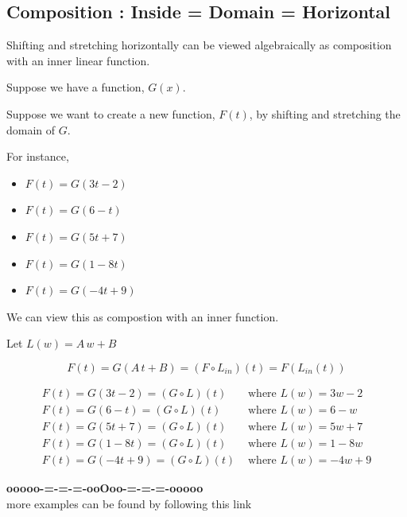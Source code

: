 \documentclass{ximera}
\begin{document}
\subsection*{Composition : Inside = Domain = Horizontal}






Shifting and stretching horizontally can be viewed algebraically as composition with an inner linear function.



Suppose we have a function, $G(x)$. 

Suppose we want to create a new function, $F(t)$, by shifting and stretching the domain of $G$.


For instance, 
\begin{itemize}
\item $F(t) = G(3t-2)$
\item $F(t) = G(6-t)$
\item $F(t) = G(5t+7)$
\item $F(t) = G(1-8t)$
\item $F(t) = G(-4t+9)$
\end{itemize}


We can view this as compostion with an inner function.

Let $L(w) = A \, w + B$


\[ F(t) = G(A \, t + B) = (F \circ L_{in})(t) = F(L_{in}(t))\]




\begin{align*}
F(t) = G(3t-2) = (G \circ L)(t)  & \text{ where } L(w) = 3w-2 \\
F(t) = G(6-t) = (G \circ L)(t)   & \text{ where } L(w) = 6-w    \\
F(t) = G(5t+7) = (G \circ L)(t)  & \text{ where } L(w) = 5w+7   \\
F(t) = G(1-8t) = (G \circ L)(t)  & \text{ where } L(w) = 1-8w    \\
F(t) = G(-4t+9) = (G \circ L)(t) & \text{ where } L(w) = -4w+9   
\end{align*}




\begin{center}
\textbf{\textcolor{green!50!black}{ooooo-=-=-=-ooOoo-=-=-=-ooooo}} \\

more examples can be found by following this link\\ 

\end{center}
\end{document}
